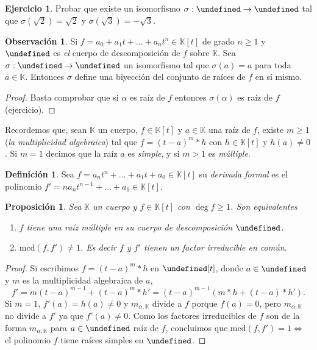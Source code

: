\documentclass[10pt, spanish]{report}
\newtheorem{prop}[tma]{Proposición}
\theoremstyle{definition}
\newtheorem*{defin}{Definición}
\newtheorem*{ejer}{Ejercicio}
\newtheorem*{obs}{Observación}
\newcommand{\K}{\mathbb{K}}
\let\L\undefined
\newcommand{\L}{\mathbb{L}}
\newcommand{\mcd}[1]{\text{mcd}(#1)}
\renewcommand{\geq}{\geqslant}
\newcommand{\fecha}[1]{\marginpar{\underline{\footnotesize{#1}}}}
\begin{document}
\begin{ejer}
    Probar que existe un isomorfismo $\sigma:\L\to\L$ tal que
    $\sigma(\sqrt{2})=\sqrt{2}$ y $\sigma(\sqrt{3})=-\sqrt{3}$.
\end{ejer}

\begin{obs}
    Si $f=a_0+a_1t+\ldots+a_nt^n\in\K[t]$ de grado $n\geq1$ y $\L$ es
    \textit{el} cuerpo de descomposición de $f$ sobre $\K$. Sea $\sigma:\L\to\L$
    un isomorfismo tal que $\sigma(a)=a$ para toda $a\in\K$. Entonces $\sigma$
    define una biyección del conjunto de raíces de $f$ en sí mismo.
\end{obs}
\begin{proof}
    Basta comprobar que si $\alpha$ es raíz de $f$ entonces $\sigma(\alpha)$ es
    raíz de $f$ (ejercicio).
\end{proof}

\fecha{11/03}

Recordemos que, sean $\K$ un cuerpo, $f\in\K[t]$ y $a\in\K$ una raíz de $f$,
existe $m\geq1$ (\textit{la multiplicidad algebraica}) tal que $f=(t-a)^m*h$ con
$h\in\K[t]$ y $h(a)\neq0$. Si $m=1$ decimos que la raíz $a$ es \textit{simple},
y si $m>1$ es \textit{múltiple}.

\begin{defin}
    Sea $f=a_nt^n+\ldots+a_1t+a_0\in\K[t]$ su \textit{derivada formal} es el
   polinomio $f'=na_nt^{n-1}+\ldots+a_1\in\K[t]$.
\end{defin}

\begin{prop}
    Sea $\K$ un cuerpo y $f\in\K[t]$ con $\deg{f}\geq1$. Son equivalentes
    \begin{enumerate}
        \item $f$ tiene una raíz múltiple en su cuerpo de descomposición $\L$.
        \item $\mcd{f,f'}\neq 1$. Es decir $f$ y $f'$ tienen un factor
            irreducible en común.
    \end{enumerate}
\end{prop}

\begin{proof}
    Si escribimos $f=(t-a)^m*h$ en $\L[t]$, donde $a\in\L$ y $m$ es la
    multiplicidad algebraica de $a$,
    \[f'=m(t-a)^{m-1}+(t-a)^m*h'=(t-a)^{m-1}(m*h+(t-a)*h').\]
    Si $m=1$, $f'(a)=h(a)\neq 0$ y $m_{\alpha,\K}$ divide a $f$ porque $f(a)=0$,
    pero $m_{\alpha,\K}$ no divide a $f'$ ya que $f'(a)\neq 0$. Como los
    factores irreducibles de $f$ son de la forma $m_{\alpha,\K}$ para $a\in\L$
    raíz de $f$, concluimos que $\mcd{f,f'}=1\Leftrightarrow$ el polinomio $f$
    tiene raíces simples en $\L$.
\end{proof}
\end{document}
